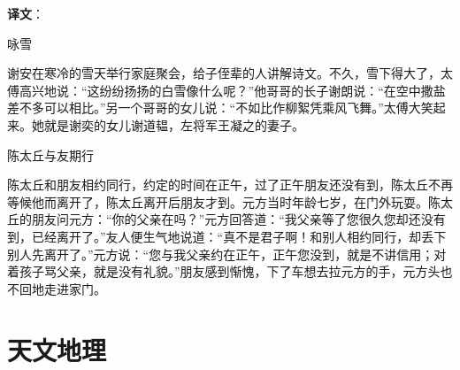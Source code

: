 \documentclass[12pt,UTF-8,openany]{ctexbook}
\begin{document}
\newpage

\textbf{译文}：

\vspace{1em}

\begin{normalsize}
    
    咏雪
    
    谢安在寒冷的雪天举行家庭聚会，给子侄辈的人讲解诗文。不久，雪下得大了，太傅高兴地说：“这纷纷扬扬的白雪像什么呢？”他哥哥的长子谢朗说：“在空中撒盐差不多可以相比。”另一个哥哥的女儿说：“不如比作柳絮凭乘风飞舞。”太傅大笑起来。她就是谢奕的女儿谢道韫，左将军王凝之的妻子。
    
    陈太丘与友期行
    
    陈太丘和朋友相约同行，约定的时间在正午，过了正午朋友还没有到，陈太丘不再等候他而离开了，陈太丘离开后朋友才到。元方当时年龄七岁，在门外玩耍。陈太丘的朋友问元方：“你的父亲在吗？”元方回答道：“我父亲等了您很久您却还没有到，已经离开了。”友人便生气地说道：“真不是君子啊！和别人相约同行，却丢下别人先离开了。”元方说：“您与我父亲约在正午，正午您没到，就是不讲信用；对着孩子骂父亲，就是没有礼貌。”朋友感到惭愧，下了车想去拉元方的手，元方头也不回地走进家门。
    
\end{normalsize}



\chapter{天文地理}
\end{document}
